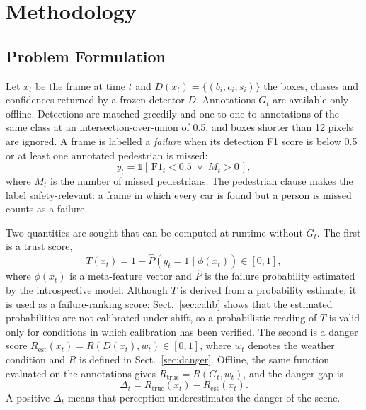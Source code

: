\documentclass[pdflatex,sn-mathphys-num]{sn-jnl}
\newcommand{\Rtrue}{R_{\mathrm{true}}}
\newcommand{\Rest}{R_{\mathrm{est}}}
\begin{document}
\section{Methodology}\label{sec:method}

\subsection{Problem Formulation}

Let $x_t$ be the frame at time $t$ and $D(x_t) = \{(b_i, c_i, s_i)\}$ the boxes, classes and confidences returned by a frozen detector $D$. Annotations $G_t$ are available only offline. Detections are matched greedily and one-to-one to annotations of the same class at an intersection-over-union of 0.5, and boxes shorter than 12 pixels are ignored. A frame is labelled a \emph{failure} when its detection F1 score is below 0.5 or at least one annotated pedestrian is missed:
\begin{equation}
y_t = \mathbb{1}\!\left[\,\mathrm{F1}_t < 0.5 \;\lor\; M_t > 0\,\right],
\label{eq:failure}
\end{equation}
where $M_t$ is the number of missed pedestrians. The pedestrian clause makes the label safety-relevant: a frame in which every car is found but a person is missed counts as a failure.

Two quantities are sought that can be computed at runtime without $G_t$. The first is a trust score,
\begin{equation}
T(x_t) = 1 - \hat{P}\!\left(y_t = 1 \mid \phi(x_t)\right) \in [0,1],
\label{eq:trust}
\end{equation}
where $\phi(x_t)$ is a meta-feature vector and $\hat{P}$ is the failure probability estimated by the introspective model. Although $T$ is derived from a probability estimate, it is used as a failure-ranking score: Sect.~\ref{sec:calib} shows that the estimated probabilities are not calibrated under shift, so a probabilistic reading of $T$ is valid only for conditions in which calibration has been verified. The second is a danger score $\Rest(x_t) = R(D(x_t), w_t) \in [0,1]$, where $w_t$ denotes the weather condition and $R$ is defined in Sect.~\ref{sec:danger}. Offline, the same function evaluated on the annotations gives $\Rtrue = R(G_t, w_t)$, and the danger gap is
\begin{equation}
\Delta_t = \Rtrue(x_t) - \Rest(x_t).
\label{eq:gap}
\end{equation}
A positive $\Delta_t$ means that perception underestimates the danger of the scene.
\end{document}
